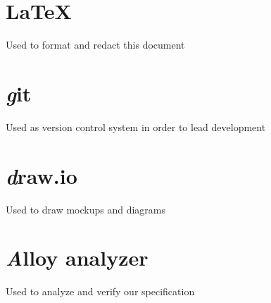 \section{\LaTeX}
Used to format and redact this document
\section{\textit git}
Used as version control system in order to lead development
\section{\textit draw.io}
Used to draw mockups and diagrams
\section{\textit Alloy analyzer}
Used to analyze and verify our specification
